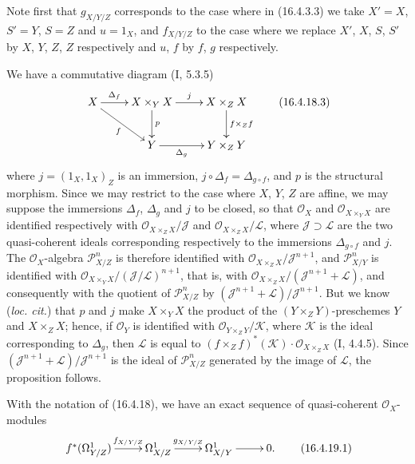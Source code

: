 Note first that $g_{X/Y/Z}$ corresponds to the case where in (16.4.3.3) we take
$X'=X$, $S'=Y$, $S=Z$ and $u=1_X$, and $f_{X/Y/Z}$ to the case where we replace
$X'$, $X$, $S$, $S'$ by $X$, $Y$, $Z$, $Z$ respectively and $u$, $f$ by
$f$, $g$ respectively.

We have a commutative diagram (I, 5.3.5)
\[
  \xymatrix{
    X\ar[r]^-{\Delta_f}\ar[dr]_-f
      &X\times_Y X\ar[d]^-p\ar[r]^-j
      &X\times_Z X\ar[d]^-{f\times_Z f}\\
    &Y\ar[r]_-{\Delta_g}&Y\times_Z Y
  }
  \tag{16.4.18.3}
  \label{IV.16.4.18.3}
\]
where $j=(1_X,1_X)_Z$ is an immersion, $j\circ\Delta_f=\Delta_{g\circ f}$, and
$p$ is the structural morphism. Since we may restrict to the case where $X$, $Y$,
$Z$ are affine, we may suppose the immersions $\Delta_f$, $\Delta_g$ and
$j$ to be closed, so that $\mathcal{O}_X$ and
$\mathcal{O}_{X\times_Y X}$ are identified respectively with
$\mathcal{O}_{X\times_Z X}/\mathscr{J}$ and
$\mathcal{O}_{X\times_Z X}/\mathscr{L}$, where
$\mathscr{J}\supset\mathscr{L}$ are the two quasi-coherent ideals
corresponding respectively to the immersions $\Delta_{g\circ f}$ and $j$. The
$\mathcal{O}_X$-algebra $\mathscr{P}_{X/Z}^n$ is therefore identified with
$\mathcal{O}_{X\times_Z X}/\mathscr{J}^{n+1}$, and
$\mathscr{P}_{X/Y}^n$ is identified with
$\mathcal{O}_{X\times_Y X}/(\mathscr{J}/\mathscr{L})^{n+1}$, that is, with
$\mathcal{O}_{X\times_Z X}/(\mathscr{J}^{n+1}+\mathscr{L})$, and consequently
with the quotient of $\mathscr{P}_{X/Z}^n$ by
$(\mathscr{J}^{n+1}+\mathscr{L})/\mathscr{J}^{n+1}$. But we know
(\emph{loc. cit.}) that $p$ and $j$ make $X\times_Y X$ the product of the
$(Y\times_Z Y)$-preschemes $Y$ and $X\times_Z X$; hence, if $\mathcal{O}_Y$ is
identified with $\mathcal{O}_{Y\times_Z Y}/\mathscr{K}$, where $\mathscr{K}$ is
the ideal corresponding to $\Delta_g$, then $\mathscr{L}$ is equal to
$(f\times_Z f)^*(\mathscr{K})\cdot\mathcal{O}_{X\times_Z X}$ (I, 4.4.5).
Since $(\mathscr{J}^{n+1}+\mathscr{L})/\mathscr{J}^{n+1}$ is the ideal of
$\mathscr{P}_{X/Z}^n$ generated by the image of $\mathscr{L}$, the
proposition follows.

\begin{corollary}[16.4.19]
\label{IV.16.4.19}
With the notation of (16.4.18), we have an exact sequence of quasi-coherent
$\mathcal{O}_X$-modules
\[
  \xymatrix{
    f^*(\Omega_{Y/Z}^1)\ar[r]^-{f_{X/Y/Z}}&
    \Omega_{X/Z}^1\ar[r]^-{g_{X/Y/Z}}&
    \Omega_{X/Y}^1\ar[r]&0.
  }
  \tag{16.4.19.1}
  \label{IV.16.4.19.1}
\]
\end{corollary}

